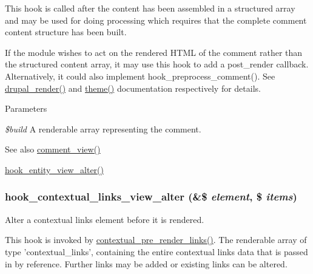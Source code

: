 This hook is called after the content has been assembled in a structured array and may be used for doing processing which requires that the complete comment content structure has been built.

If the module wishes to act on the rendered HTML of the comment rather than the structured content array, it may use this hook to add a post\_\-render callback. Alternatively, it could also implement hook\_\-preprocess\_\-comment(). See \hyperlink{common_8inc_a05798b44e8d6c496d4bee5cc32fa7851}{drupal\_\-render()} and \hyperlink{includes_2theme_8inc_a7c25609a935874541a19657affd30fff}{theme()} documentation respectively for details.


\begin{DoxyParams}{Parameters}
\item[{\em \$build}]A renderable array representing the comment.\end{DoxyParams}
\begin{DoxySeeAlso}{See also}
\hyperlink{comment_8module_a68dd73af772c948e0f8a6cb144bef2cf}{comment\_\-view()} 

\hyperlink{group__hooks_ga2c2be6c70815b426f0eb13b0b68edb40}{hook\_\-entity\_\-view\_\-alter()} 
\end{DoxySeeAlso}
\hypertarget{group__hooks_ga30ebdd98be1d239b608b769bda0ca9f0}{
\subsubsection[{hook\_\-contextual\_\-links\_\-view\_\-alter}]{\setlength{\rightskip}{0pt plus 5cm}hook\_\-contextual\_\-links\_\-view\_\-alter (\&\$ {\em element}, \/  \$ {\em items})}}
\label{group__hooks_ga30ebdd98be1d239b608b769bda0ca9f0}
Alter a contextual links element before it is rendered.

This hook is invoked by \hyperlink{contextual_8module_a8092553aa170452c7082015e1b930d6b}{contextual\_\-pre\_\-render\_\-links()}. The renderable array of type 'contextual\_\-links', containing the entire contextual links data that is passed in by reference. Further links may be added or existing links can be altered.


